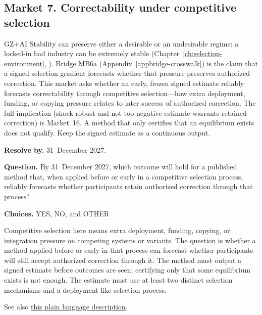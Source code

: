 \subsection{Market 7. Correctability under competitive selection}
\label{sec:appp-m7}

\begin{authbar}{GZ+AI}
Stability can preserve either a desirable or an undesirable regime: a locked-in bad industry can be extremely stable (Chapter~\ref{ch:selection-environment}, \textcite{kulveit2025gradualdisempowerment}).
Bridge \(\text{MB6a}\) (Appendix~\ref{appbridge-crosswalk}) is the claim that a signed selection gradient forecasts whether that pressure preserves authorized correction.
This market asks whether an early, frozen signed estimate reliably forecasts correctability through competitive selection---how extra deployment, funding, or copying pressure relates to later success of authorized correction.
The full implication (shock-robust and not-too-negative estimate warrants retained correction) is Market~16.
A method that only certifies that an equilibrium exists does not qualify.
Keep the signed estimate as a continuous output.
\end{authbar}
\begin{predictionbox}
\textbf{Resolve by.} 31~December 2027.

\textbf{Question.}
By 31~December 2027, which outcome will hold for a published method that, when applied before or early in a competitive selection process, reliably forecasts whether participants retain authorized correction through that process?

\textbf{Choices.} YES, NO, and OTHER
\end{predictionbox}
\begin{predictionbackground}
Competitive selection here means extra deployment, funding, copying, or integration pressure on competing systems or variants.
The question is whether a method applied before or early in that process can forecast whether participants will still accept authorized correction through it.
The method must output a signed estimate before outcomes are seen; certifying only that some equilibrium exists is not enough.
The estimate must use at least two distinct selection mechanisms and a deployment-like selection process.

See also \href{https://towards-alignment.com/cards/the-environment-picks-the-winner/}{this plain language description}.
\end{predictionbackground}
